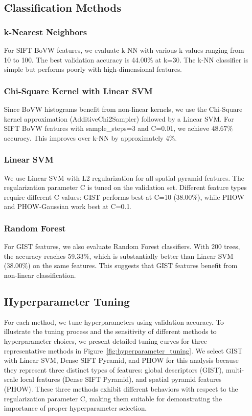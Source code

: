 \documentclass[10pt,twocolumn,letterpaper]{article}
\begin{document}
\subsection{Classification Methods}

\subsubsection{k-Nearest Neighbors}
For SIFT BoVW features, we evaluate k-NN with various k values ranging from 10 to 100. The best validation accuracy is 44.00\% at k=30. The k-NN classifier is simple but performs poorly with high-dimensional features.

\subsubsection{Chi-Square Kernel with Linear SVM}
Since BoVW histograms benefit from non-linear kernels, we use the Chi-Square kernel approximation (AdditiveChi2Sampler) followed by a Linear SVM. For SIFT BoVW features with sample\_steps=3 and C=0.01, we achieve 48.67\% accuracy. This improves over k-NN by approximately 4\%.

\subsubsection{Linear SVM}
We use Linear SVM with L2 regularization for all spatial pyramid features. The regularization parameter C is tuned on the validation set. Different feature types require different C values: GIST performs best at C=10 (38.00\%), while PHOW and PHOW-Gaussian work best at C=0.1.

\subsubsection{Random Forest}
For GIST features, we also evaluate Random Forest classifiers. With 200 trees, the accuracy reaches 59.33\%, which is substantially better than Linear SVM (38.00\%) on the same features. This suggests that GIST features benefit from non-linear classification.

\subsection{Hyperparameter Tuning}

For each method, we tune hyperparameters using validation accuracy. To illustrate the tuning process and the sensitivity of different methods to hyperparameter choices, we present detailed tuning curves for three representative methods in Figure~\ref{fig:hyperparameter_tuning}. We select GIST with Linear SVM, Dense SIFT Pyramid, and PHOW for this analysis because they represent three distinct types of features: global descriptors (GIST), multi-scale local features (Dense SIFT Pyramid), and spatial pyramid features (PHOW). These three methods exhibit different behaviors with respect to the regularization parameter C, making them suitable for demonstrating the importance of proper hyperparameter selection.
\end{document}
